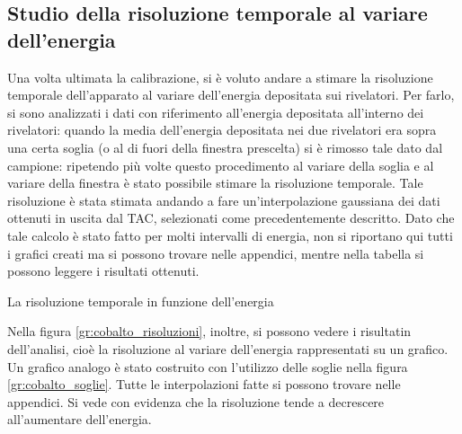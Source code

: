 \subsection{Studio della risoluzione temporale al variare dell'energia}

Una volta ultimata la calibrazione, si è voluto andare a stimare la risoluzione temporale dell'apparato al variare dell'energia depositata sui
rivelatori. Per farlo, si sono analizzati i dati con riferimento all'energia depositata all'interno dei rivelatori: quando la media dell'energia
depositata nei due rivelatori era sopra una certa soglia (o al di fuori della finestra prescelta) si è rimosso tale dato dal campione: ripetendo più
volte questo procedimento al variare della soglia e al variare della finestra è stato possibile stimare la risoluzione temporale. Tale
risoluzione è stata stimata andando a fare un'interpolazione gaussiana dei dati ottenuti in uscita dal TAC, selezionati come precedentemente descritto.
Dato che tale calcolo è stato fatto per molti intervalli di energia, non si riportano qui tutti i grafici creati ma si possono trovare nelle appendici,
mentre nella tabella si possono leggere i risultati ottenuti.\\

%
\begin{tabella}
	\centering
	
	\caption{La risoluzione temporale in funzione dell'energia}
	\label{tab:01tab1}
\end{tabella}
%
Nella figura \ref{gr:cobalto_risoluzioni}, inoltre, si possono vedere i risultatin dell'analisi, cioè la risoluzione al variare dell'energia rappresentati su un grafico.
Un grafico analogo è stato costruito con l'utilizzo delle soglie nella figura \ref{gr:cobalto_soglie}. Tutte le interpolazioni fatte si possono trovare nelle appendici. Si
vede con evidenza che la risoluzione tende a decrescere all'aumentare dell'energia.
\\
\\


